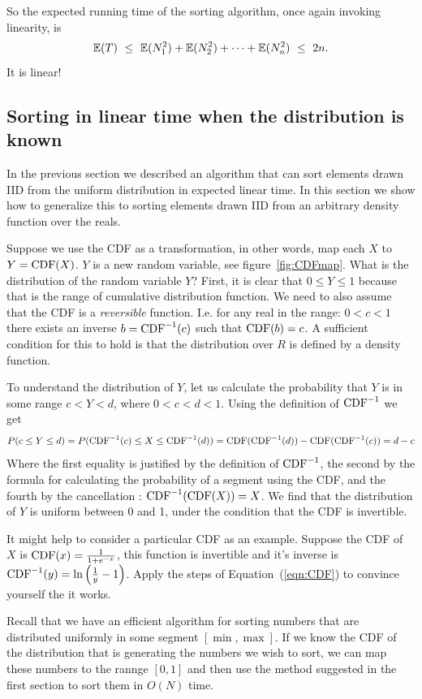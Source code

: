 So the expected running time of the sorting algorithm, once again invoking linearity, is
$$ \mathbb{E}(T) 
\ \leq \ \mathbb{E}(N_1^2) + \mathbb{E}(N_2^2) + \cdots + \mathbb{E}(N_n^2) 
\ \leq \ 2n
.$$
It is linear!

\subsection{Sorting in linear time when the distribution is known}

In the previous section we described an algorithm that can sort
elements drawn IID from the uniform distribution in expected linear
time. In this section we show how to generalize this to sorting
elements drawn IID from an arbitrary density function over the reals.

Suppose we use the CDF as a transformation, in other words, map each
$X$ to $Y=\mbox{CDF}(X)$. $Y$ is a new random variable, see
figure~\ref{fig:CDFmap}. What is the distribution of the random
variable $Y$? First, it is clear that $0 \leq Y \leq 1$ because that
is the range of cumulative distribution function. We need to also
assume that the CDF is a {\em reversible} function. I.e. for any real
in the range: $0<c<1$ there exists an inverse $b=\mbox{CDF}^{-1}(c)$ such
that $\mbox{CDF}(b)=c$. A sufficient condition for this to hold is that the
distribution over $R$ is defined by a density function.

To understand the distribution of $Y$, let us calculate the
probability that $Y$ is in some range $c<Y<d$, where $0<c<d<1$.
Using the definition of $\mbox{CDF}^{-1}$ we get
\begin{equation} \label{eqn:CDF}
P(c \leq Y \leq d) = P(\mbox{CDF}^{-1}(c) \leq X \leq \mbox{CDF}^{-1}(d)) =
\mbox{CDF}(\mbox{CDF}^{-1}(d))-\mbox{CDF}(\mbox{CDF}^{-1}(c)) = d-c
\end{equation}
Where the first equality is justified by the definition of
$\mbox{CDF}^{-1}$, the second by the formula for calculating the probability
of a segment using the CDF, and the fourth by the cancellation :
$\mbox{CDF}^{-1}(\mbox{CDF}(X))=X$.  We find that the distribution of $Y$ is
uniform between 0 and 1, under the condition that the CDF is invertible.

It might help to consider a particular CDF as an example. Suppose the
CDF of $X$ is $\mbox{CDF}(x) = \frac{1}{1+e^{-x}}$, this function is
invertible and it's inverse is
$\mbox{CDF}^{-1}(y)=\ln\left(\frac{1}{y}-1\right)$. Apply the steps of
Equation~(\ref{eqn:CDF}) to convince yourself the it works.

Recall that we have an efficient algorithm for sorting numbers that
are distributed uniformly in some segment $[\min,\max]$.
If we know the CDF of the distribution that is generating the
numbers we wish to sort, we can map these numbers to the rannge
$[0,1]$ and then use the method suggested in the first section to sort
them in $O(N)$ time.

